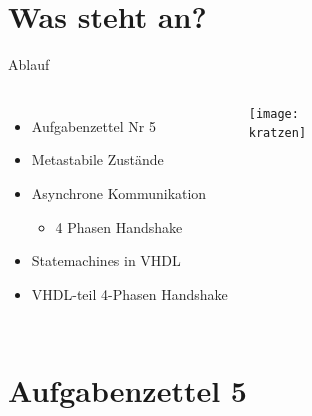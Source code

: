   \section{Was steht an?}
  \begin{frame}{Ablauf}
    \begin{columns}
        \begin{itemize}
          \item Aufgabenzettel Nr 5
          \item Metastabile Zustände
          \item Asynchrone Kommunikation
          \begin{itemize}
            \item 4 Phasen Handshake
          \end{itemize}
          \item Statemachines in VHDL
          \item VHDL-teil 4-Phasen Handshake
        \end{itemize}
        \texttt{[image: \\kratzen]}
    \end{columns}
  \end{frame}


  \section{Aufgabenzettel 5}


